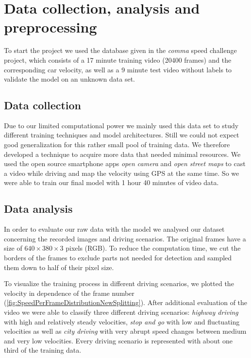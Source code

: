 \documentclass[conference]{IEEEtran}
\begin{document}
\section{Data collection, analysis and preprocessing}

To start the project we used the database given in the \emph{comma} speed challenge project, which consists of a 17 minute training video (20400 frames) and the corresponding car velocity, as well as a 9 minute test video without labels to validate the model on an unknown data set.

\subsection{Data collection}

Due to our limited computational power we mainly used this data set to study different training techniques and model architectures. Still we could not expect good generalization for this rather small pool of training data. We therefore developed a technique to acquire more data that needed minimal resources. We used the open source smartphone apps \emph{open camera} and \emph{open street maps} to cast a video while driving and map the velocity using GPS at the same time. So we were able to train our final model with 1 hour 40 minutes of video data.

\subsection{Data analysis}

In order to evaluate our raw data with the model we analysed our dataset concerning the recorded images and driving scenarios. The original frames have a size of $640\times380\times3$ pixels (RGB). To reduce the computation time, we cut the borders of the frames to exclude parts not needed for detection and sampled them down to half of their pixel size.

To visualize the training process in different driving scenarios, we plotted the velocity in dependence of the frame number (\cref{fig:SpeedPerFrameDistributionNewSplitting}). After additional evaluation of the video we were able to classify three different driving scenarios: \emph{highway driving} with high and relatively steady velocities, \emph{stop and go} with low and fluctuating velocities as well as \emph{city driving} with very abrupt speed changes between medium and very low velocities. Every driving scenario is represented with about one third of the training data.
\end{document}
